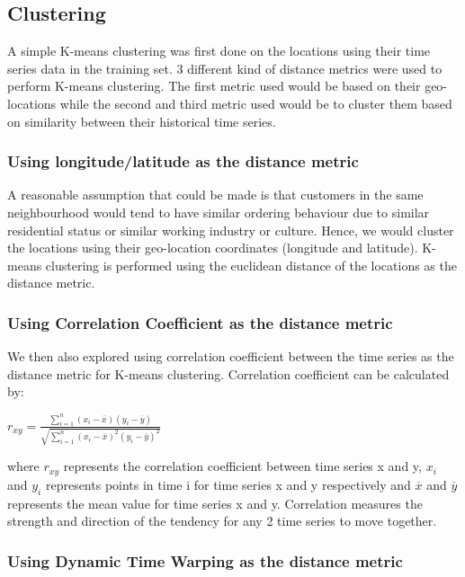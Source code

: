 \documentclass[12pt, letterpaper] {article}
\begin{document}
\noindent 
\subsection{Clustering}

A simple K-means clustering was first done on the locations using their time series data in the training set. 3 different kind of distance metrics were used to perform K-means clustering. The first metric used would be based on their geo-locations while the second and third metric used would be to cluster them based on similarity between their historical time series. 

\subsubsection{Using longitude/latitude as the distance metric}

A reasonable assumption that could be made is that customers in the same neighbourhood would tend to have similar ordering behaviour due to similar residential status or similar working industry or culture. Hence, we would cluster the locations using their geo-location coordinates (longitude and latitude). K-means clustering is performed using the euclidean distance of the locations as the distance metric.   

\subsubsection{Using Correlation Coefficient as the distance metric}

We then also explored using correlation coefficient between the time series as the distance metric for K-means clustering. Correlation coefficient can be calculated by: 

\begin{center}
$r_{xy} = \frac{\sum_{i=1}^{n} (x_i - \overline{x})(y_i - \overline{y})}
{\sqrt{\sum_{i=1}^{n} (x_i - \overline{x})^2(y_i - \overline{y})^2}} $
\end{center}

\noindent where $r_{xy}$ represents the correlation coefficient between time series x and y, $x_i$ and $y_i$ represents points in time i for time series x and y respectively and $\overline{x}$ and $\overline{y}$ represents the mean value for time series x and y. Correlation measures the strength and direction of the tendency for any 2 time series to move together. 

\subsubsection{Using Dynamic Time Warping as the distance metric}
\end{document}
